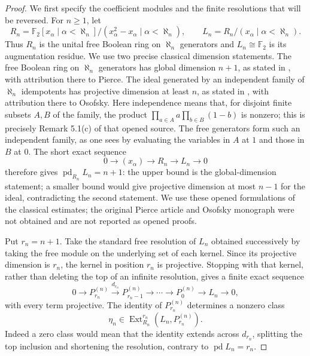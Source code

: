 \begin{proof}
We first specify the coefficient modules and the finite resolutions that will be reversed. For $n\geq1$, let
\[
 R_n=\mathbb F_2[x_\alpha\mid\alpha<\aleph_n]
       /(x_\alpha^2-x_\alpha\mid\alpha<\aleph_n),
 \qquad L_n=R_n/(x_\alpha\mid\alpha<\aleph_n).
\]
Thus $R_n$ is the unital free Boolean ring on $\aleph_n$ generators and $L_n\cong\mathbb F_2$ is its augmentation residue. We use two precise classical dimension statements. The free Boolean ring on $\aleph_n$ generators has global dimension $n+1$, as stated in \citet[p.~319, following Corollary 1.5]{Osofsky1968C}, with attribution there to Pierce. The ideal generated by an independent family of $\aleph_n$ idempotents has projective dimension at least $n$, as stated in \citet[Remark 5.1(e), p.~917]{FinnMartinezMcGovern1997C}, with attribution there to Osofsky. Here independence means that, for disjoint finite subsets $A,B$ of the family, the product $\prod_{a\in A}a\prod_{b\in B}(1-b)$ is nonzero; this is precisely Remark 5.1(c) of that opened source. The free generators form such an independent family, as one sees by evaluating the variables in $A$ at $1$ and those in $B$ at $0$. The short exact sequence
\[
 0\longrightarrow(x_\alpha)\longrightarrow R_n\longrightarrow L_n\longrightarrow0
\]
therefore gives $\operatorname{pd}_{R_n}L_n=n+1$: the upper bound is the global-dimension statement; a smaller bound would give projective dimension at most $n-1$ for the ideal, contradicting the second statement. We use these opened formulations of the classical estimates; the original Pierce article and Osofsky monograph were not obtained and are not reported as opened proofs.

Put $r_n=n+1$. Take the standard free resolution of $L_n$ obtained successively by taking the free module on the underlying set of each kernel. Since its projective dimension is $r_n$, the kernel in position $r_n$ is projective. Stopping with that kernel, rather than deleting the top of an infinite resolution, gives a finite exact sequence
\[
 0\longrightarrow P^{(n)}_{r_n}\xrightarrow{d_{r_n}}
 P^{(n)}_{r_n-1}\longrightarrow\cdots\longrightarrow
 P^{(n)}_0\longrightarrow L_n\longrightarrow0,
 \tag{C-finite-resolution}\label{Cfiniteresolution}
\]
with every term projective. The identity of $P^{(n)}_{r_n}$ determines a nonzero class
\[
 \eta_n\in\operatorname{Ext}^{r_n}_{R_n}
             (L_n,P^{(n)}_{r_n}).
\]
Indeed a zero class would mean that the identity extends across $d_{r_n}$, splitting the top inclusion and shortening the resolution, contrary to $\operatorname{pd}L_n=r_n$.


\end{proof}
